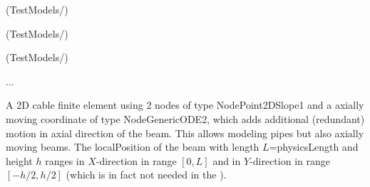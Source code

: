 \item {} (TestModels/)
\item {} (TestModels/)
\item {} (TestModels/)
\item  ...


\ei

%
\newpage


\label{sec:item:ObjectALEANCFCable2D}
A 2D cable finite element using 2 nodes of type NodePoint2DSlope1 and a axially moving coordinate of type NodeGenericODE2, which adds additional (redundant) motion in axial direction of the beam. This allows modeling pipes but also axially moving beams. The localPosition of the beam with length $L$=physicsLength and height $h$ ranges in $X$-direction in range $[0, L]$ and in $Y$-direction in range $[-h/2,h/2]$ (which is in fact not needed in the ).
\vspace{12pt}\\

